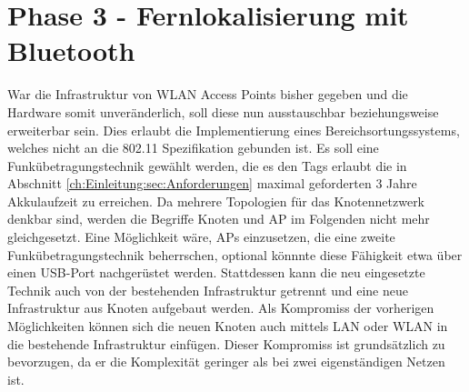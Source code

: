 \chapter{Phase 3 - Fernlokalisierung mit Bluetooth}
\label{ch:phase3}
War die Infrastruktur von WLAN Access Points bisher gegeben und die Hardware somit unveränderlich, soll diese nun ausstauschbar beziehungsweise erweiterbar sein.
Dies erlaubt die Implementierung eines Bereichsortungssystems, welches nicht an die 802.11 Spezifikation gebunden ist.
Es soll eine Funkübetragungstechnik gewählt werden, die es den Tags erlaubt die in Abschnitt \ref{ch:Einleitung:sec:Anforderungen} maximal geforderten 3 Jahre Akkulaufzeit zu erreichen.
Da mehrere Topologien für das Knotennetzwerk denkbar sind, werden die Begriffe Knoten und AP im Folgenden nicht mehr gleichgesetzt.
Eine Möglichkeit wäre, APs einzusetzen, die eine zweite Funkübetragungstechnik beherrschen, optional könnnte diese Fähigkeit etwa über einen USB-Port nachgerüstet werden.
Stattdessen kann die neu eingesetzte Technik auch von der bestehenden Infrastruktur getrennt und eine neue Infrastruktur aus Knoten aufgebaut werden.
Als Kompromiss der vorherigen Möglichkeiten können sich die neuen Knoten auch mittels LAN oder WLAN in die bestehende Infrastruktur einfügen. 
Dieser Kompromiss ist grundsätzlich zu bevorzugen, da er die Komplexität geringer als bei zwei eigenständigen Netzen ist.

